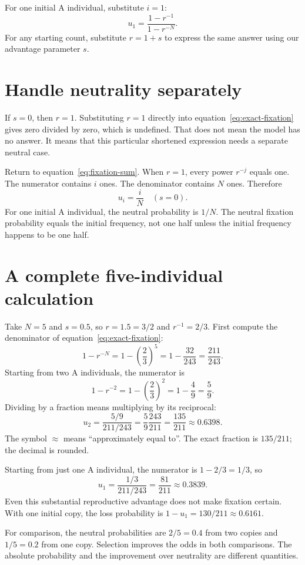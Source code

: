 For one initial A individual, substitute \(i=1\):
\[
 u_1=\frac{1-r^{-1}}{1-r^{-N}}.
\]
For any starting count, substitute \(r=1+s\) to express the same answer
using our advantage parameter \(s\).

\section{Handle neutrality separately}

If \(s=0\), then \(r=1\). Substituting \(r=1\) directly into
equation~\eqref{eq:exact-fixation} gives zero divided by zero, which is
undefined. That does not mean the model has no answer. It means that this
particular shortened expression needs a separate neutral case.

Return to equation~\eqref{eq:fixation-sum}. When \(r=1\), every power
\(r^{-j}\) equals one. The numerator contains \(i\) ones. The denominator
contains \(N\) ones. Therefore
\begin{equation}
 \boxed{\displaystyle u_i=\frac{i}{N}\quad(s=0).}
 \label{eq:neutral-fixation}
\end{equation}
For one initial A individual, the neutral probability is \(1/N\). The
neutral fixation probability equals the initial frequency, not one half
unless the initial frequency happens to be one half.

\section{A complete five-individual calculation}

Take \(N=5\) and \(s=0.5\), so \(r=1.5=3/2\) and \(r^{-1}=2/3\).
First compute the denominator of equation~\eqref{eq:exact-fixation}:
\[
 1-r^{-N}=1-\left(\frac23\right)^5
 =1-\frac{32}{243}=\frac{211}{243}.
\]
Starting from two A individuals, the numerator is
\[
 1-r^{-2}=1-\left(\frac23\right)^2
 =1-\frac49=\frac59.
\]
Dividing by a fraction means multiplying by its reciprocal:
\[
 u_2=\frac{5/9}{211/243}
 =\frac59\frac{243}{211}=\frac{135}{211}\approx0.6398.
\]
The symbol \(\approx\) means ``approximately equal to''. The exact fraction
is \(135/211\); the decimal is rounded.

Starting from just one A individual, the numerator is \(1-2/3=1/3\), so
\[
 u_1=\frac{1/3}{211/243}=\frac{81}{211}\approx0.3839.
\]
Even this substantial reproductive advantage does not make fixation certain.
With one initial copy, the loss probability is
\(1-u_1=130/211\approx0.6161\).

For comparison, the neutral probabilities are \(2/5=0.4\) from two copies
and \(1/5=0.2\) from one copy. Selection improves the odds in both
comparisons. The absolute probability and the improvement over neutrality
are different quantities.

